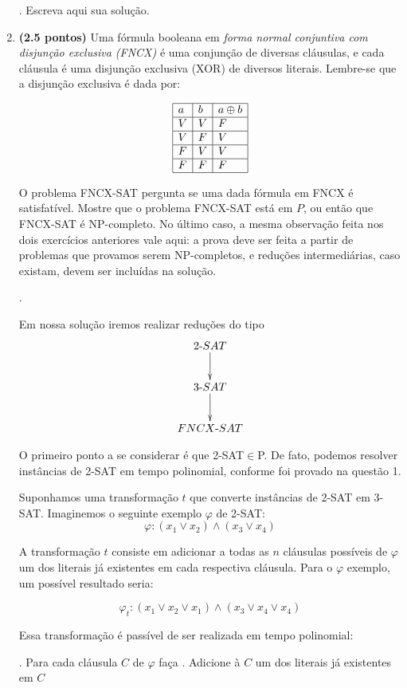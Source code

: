 \documentclass[12pt]{article}
\newcommand{\resposta}[1]{ \noindent {\bf Solução}.{\color{blue} #1}}
\begin{document}
\begin{enumerate}
  \resposta{
    Escreva aqui sua solução.
  }
  
\item {\bf (2.5 pontos)} Uma fórmula booleana em {\it forma normal conjuntiva com disjunção exclusiva (FNCX)} é uma conjunção de diversas cláusulas, e cada cláusula é uma disjunção exclusiva (XOR) de diversos literais. Lembre-se que a disjunção exclusiva é dada por:

  $$\begin{array}{|l|l|l|}\hline
      a & b & a \oplus b \\ \hline
      V & V & F \\ \hline
      V & F & V \\ \hline
      F & V & V \\ \hline
      F & F & F \\ \hline
  \end{array}$$

  O problema FNCX-SAT pergunta se uma dada fórmula em FNCX é
  satisfatível. Mostre que o problema FNCX-SAT está em $P$, ou então
  que FNCX-SAT é NP-completo. No último caso, a mesma observação feita
  nos dois exercícios anteriores vale aqui: a prova deve ser feita a
  partir de problemas que provamos serem NP-completos, e reduções
  intermediárias, caso existam, devem ser incluídas na solução.

  \resposta{
    Em nossa solução iremos realizar reduções do tipo 
    $$\xymatrix{
    2\mbox{-}SAT \ar[d] \\
    3\mbox{-}SAT \ar[d] \\
    FNCX\mbox{-}SAT 
  }$$
  
  O primeiro ponto a se considerar é que 2-SAT$\in$P. De fato, podemos resolver instâncias de 2-SAT em tempo polinomial, conforme foi provado na questão 1.
  
  Suponhamos uma transformação $t$ que converte instâncias de 2-SAT em 3-SAT. Imaginemos o seguinte exemplo $\varphi$ de 2-SAT: $$\varphi: (x_1 \vee x_2) \wedge (x_3 \vee x_4)$$
  
  A transformação $t$ consiste em adicionar a todas as $n$ cláusulas possíveis de $\varphi$ um dos literais já existentes em cada respectiva cláusula. Para o $\varphi$ exemplo, um possível resultado seria:
  
  $$\varphi_t: (x_1 \vee x_2 \vee x_1) \wedge (x_3 \vee x_4 \vee x_4)$$
  
  Essa transformação é passível de ser realizada em tempo polinomial:
  \newline
  \begin{itemize}
      \itemize 1. Para cada cláusula $C$ de $\varphi$ faça
      \newline
      \itemize 2. \quad Adicione à $C$ um dos literais já existentes em $C$
  \end{itemize}
  
}
\end{enumerate}
\end{document}
